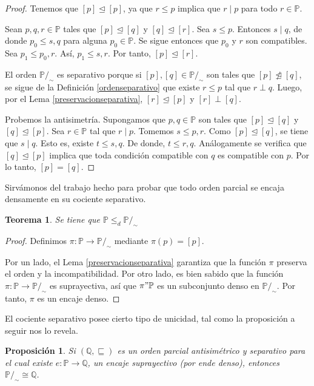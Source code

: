 \documentclass[11pt]{unam_tesis1}
\theoremstyle{MyThmStyle}
\theoremstyle{definition}
\theoremstyle{plain}
\newtheorem{theorem}[definition]{Teorema}
\newtheorem{proposition}[definition]{Proposici\'on}
\theoremstyle{remark}
\let\leq\leqslant
\begin{document}
\begin{proof}
Tenemos que $[p]\trianglelefteq [p]$, ya que $r\leq p$ implica que $r\mid p$ para todo $r\in \mathbb P$.

Sean $p,q,r \in \mathbb P$ tales que  $[p]\trianglelefteq [q]$ y $[q]\trianglelefteq [r]$. Sea $s\leq p$. Entonces $s\mid q$, de donde $p_0\leq s,q$ para alguna $p_0\in \mathbb P$. Se sigue entonces que $p_0$ y $r$ son compatibles. Sea $p_1\leq p_0,r$. As\'i, $p_1\leq s,r$. Por tanto, $[p]\trianglelefteq [r]$.

El orden $\mathbb{P}/_\sim$ es separativo porque si $[p], [q]\in \mathbb{P}/_\sim$ son tales que $[p]\not \trianglelefteq [q]$, se sigue de la Definici\'on \ref{ordenseparativo} que existe $r\leq p$ tal que $r\perp q$. Luego, por el Lema \ref{preservacionseparativa}, $[r]\trianglelefteq [p]$ y $[r]\perp [q]$.

Probemos la antisimetr\'ia. Supongamos que $p,q\in \mathbb P$ son tales que  $[p]\trianglelefteq [q]$ y $[q]\trianglelefteq [p]$. Sea $r\in \mathbb P$ tal que $r\mid p$. Tomemos $s\leq p,r$. Como $[p]\trianglelefteq [q]$, se tiene que $s\mid q$. Esto es, existe $t\leq s,q$. De donde, $t\leq r,q$. An\'alogamente se verifica que $[q] \unlhd [p]$ implica que toda condici\'on compatible con $q$ es compatible con $p$. Por lo tanto, $[p]=[q]$.
\end{proof}

Sirv\'amonos del trabajo hecho para probar que todo orden parcial se encaja densamente en su cociente separativo.

\begin{theorem}
Se tiene que $\mathbb P \leq_d \mathbb P/_\sim$
\end{theorem}

\begin{proof}
Definimos $\pi:\mathbb P\to \mathbb P/_\sim$ mediante $\pi(p)=[p]$.

Por un lado, el Lema \ref{preservacionseparativa} garantiza que la funci\'on $\pi$ preserva el orden y la incompatibilidad. Por otro lado, es bien sabido que la funci\'on  $\pi:\mathbb P\to \mathbb P/_\sim$ es suprayectiva, as\'i que $\pi"\mathbb P$ es un subconjunto denso en $\mathbb P/_\sim$. Por tanto, $\pi$ es un encaje denso.
\end{proof}

El cociente separativo posee cierto tipo de unicidad, tal como la proposici\'on a seguir nos lo revela.

\begin{proposition}\label{unicidadcociente}
Si $(\mathbb Q, \sqsubseteq)$ es un orden parcial antisim\'etrico y separativo para el cual existe $e:\mathbb P\to \mathbb Q$, un encaje suprayectivo (por ende denso), entonces $\mathbb P/_\sim \cong \mathbb Q$.
\end{proposition}
\end{document}
